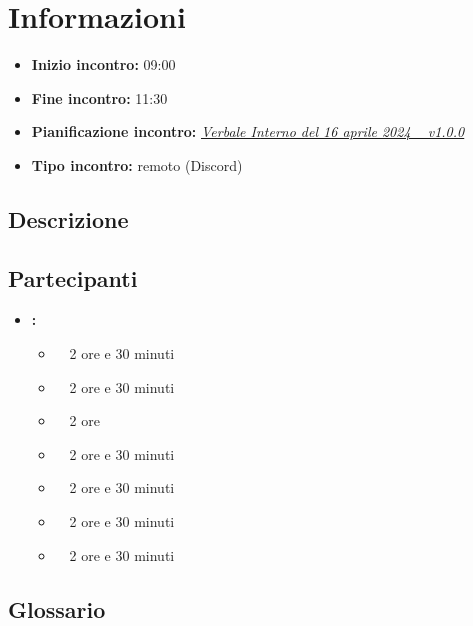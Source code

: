 \section{Informazioni}
\begin{itemize}
	\item \textbf{Inizio incontro:} 09:00
	\item \textbf{Fine incontro:} 11:30
	\item \textbf{Pianificazione incontro:} \href{https://argo-swe.github.io/2 - RTB/Verbali/Interni/VerbaleInterno_2024-04-16.pdf}{\emph{Verbale Interno del 16 aprile 2024 \  v1.0.0}}
	\item \textbf{Tipo incontro:} remoto (Discord)
\end{itemize}

\subsection{Descrizione}
\DocDescription

\subsection{Partecipanti}

\begin{itemize}
	\item \textbf{\GroupName:}
	\begin{itemize}
		\item \tommaso \ \rightarrow\ 2 ore e 30 minuti
		\item \marco \ \rightarrow\ 2 ore e 30 minuti
		\item \sebastiano \ \rightarrow\ 2 ore
		\item \martina \ \rightarrow\ 2 ore e 30 minuti
		\item \riccardo \ \rightarrow\ 2 ore e 30 minuti
		\item \mattia \ \rightarrow\ 2 ore e 30 minuti
    \item \raul \ \rightarrow\ 2 ore e 30 minuti
	\end{itemize}
\end{itemize}

\subsection{Glossario}
\GlossarioIntroduzione

\clearpage